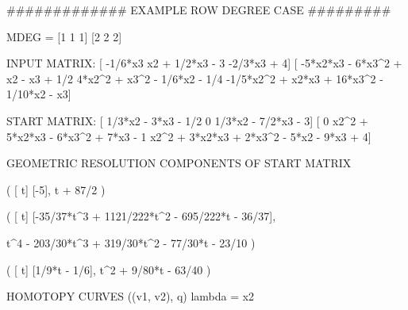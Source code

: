 


############# EXAMPLE  ROW DEGREE CASE #########

MDEG = [1   1   1]
       [2   2   2]


INPUT MATRIX:
[                  -1/6*x3                            x2 + 1/2*x3 - 3                                -2/3*x3 + 4]
[         -5*x2*x3 - 6*x3^2 + x2 - x3 + 1/2   4*x2^2 + x3^2 - 1/6*x2 - 1/4         -1/5*x2^2 + x2*x3 + 16*x3^2 - 1/10*x2 - x3]

START MATRIX: 
[                      1/3*x2 - 3*x3 - 1/2                   0                           1/3*x2 - 7/2*x3 - 3]
[                                        0        x2^2 + 5*x2*x3 - 6*x3^2 + 7*x3 - 1     x2^2 + 3*x2*x3 + 2*x3^2 - 5*x2 - 9*x3 + 4]



GEOMETRIC RESOLUTION COMPONENTS OF START MATRIX

(
[ t]          
[-5], t + 87/2
)



(
[                                            t]
[-35/37*t^3 + 1121/222*t^2 - 695/222*t - 36/37],

t^4 - 203/30*t^3 + 319/30*t^2 - 77/30*t - 23/10
)




(
[          t]                      
[1/9*t - 1/6], t^2 + 9/80*t - 63/40
)


HOMOTOPY CURVES ((v1, v2), q) lambda = x2



